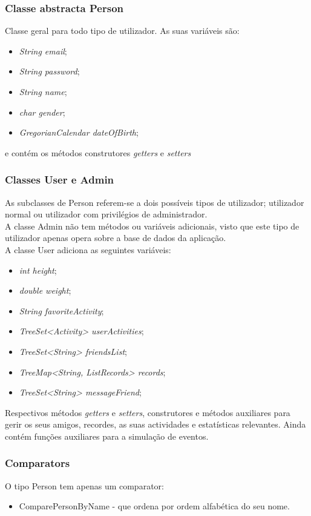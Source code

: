 \documentclass[10pt,notitlepage]{article}
\begin{document}
\subsubsection{Classe abstracta Person}
Classe geral para todo tipo de utilizador. As suas variáveis são:
\begin{itemize}
\item \textit{String email};
\item \textit{String password};
\item \textit{String name};
\item \textit{char gender};
\item \textit{GregorianCalendar dateOfBirth};
\end{itemize}
e contém os métodos construtores \textit{getters} e \textit{setters}

\subsubsection{Classes User e Admin}

As subclasses de Person referem-se a dois possíveis tipos de utilizador; utilizador normal ou utilizador com privilégios de administrador.\\
A classe Admin não tem métodos ou variáveis adicionais, visto que este tipo de utilizador apenas opera sobre a base de dados da aplicação.\\
A classe User adiciona as seguintes variáveis:
\begin{itemize}
\item \textit{int height};
\item \textit{double weight};
\item \textit{String favoriteActivity};
\item \textit{TreeSet<Activity> userActivities};
\item \textit{TreeSet<String> friendsList};
\item \textit{TreeMap<String, ListRecords> records};
\item \textit{TreeSet<String> messageFriend};
\end{itemize}
Respectivos métodos \textit{getters} e \textit{setters}, construtores e métodos auxiliares para gerir os seus amigos, recordes, as suas actividades e estatísticas relevantes. Ainda contém funções auxiliares para a simulação de eventos.

\subsubsection{Comparators}
O tipo Person tem apenas um comparator:
\begin{itemize}
\item ComparePersonByName - que ordena por ordem alfabética do seu nome.
\end{itemize}
\end{document}
